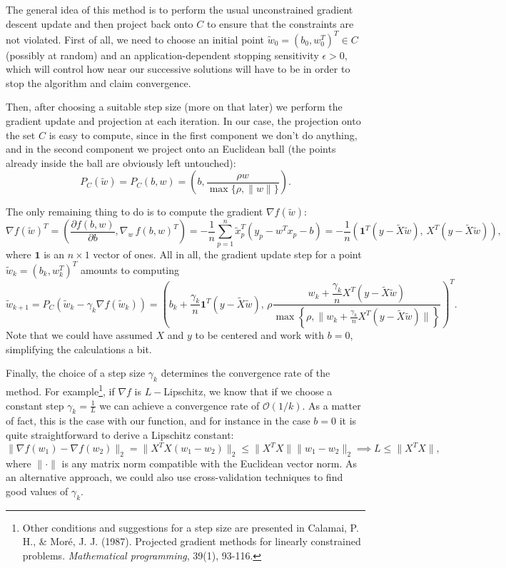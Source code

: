 \documentclass[11pt]{article}
\begin{document}
The general idea of this method is to perform the usual unconstrained gradient descent update and then project back onto $C$ to ensure that the constraints are not violated. First of all, we need to choose an initial point $\tilde w_0=(b_0, w_0^T)^T\in C$ (possibly at random) and an application-dependent stopping sensitivity $\epsilon > 0$, which will control how near our successive solutions will have to be in order to stop the algorithm and claim convergence.

Then, after choosing a suitable step size (more on that later) we perform the gradient update and projection at each iteration. In our case, the projection onto the set $C$ is easy to compute, since in the first component we don't do anything, and in the second component we project onto an Euclidean ball (the points already inside the ball are obviously left untouched):
\[
P_C(\tilde w) = P_C(b, w) = \left(b, \frac{\rho w}{\max\{\rho, \|w\|\}}\right).
\]

The only remaining thing to do is to compute the gradient $\nabla f(\tilde w)$:
\[
\nabla f(\tilde w)^T = \left(\frac{\partial f(b, w)}{\partial b}, \nabla_w \, f(b, w)^T \right) = -\frac{1}{n} \sum_{p=1}^n \tilde x_p^T(y_p - w^Tx_p - b)= -\frac{1}{n}\left(\boldsymbol{1}^T(y-\tilde X\tilde w), \, X^T(y-\tilde X\tilde w)\right),
\]
where $\boldsymbol{1}$ is an $n\times 1$ vector of ones. All in all, the gradient update step for a point $\tilde w_k = (b_k, w_k^T)^T$ amounts to computing
\[
\tilde w_{k+1} = P_C(\tilde w_k-\gamma_k\nabla f(\tilde w_k)) = \left(b_k + \frac{\gamma_k}{n} \boldsymbol{1}^T(y-\tilde X\tilde w), \, \rho \frac{w_k + \dfrac{\gamma_k}{n} X^T(y-\tilde X\tilde w)}{\max \left\{ \rho, \|w_k + \frac{\gamma_k}{n} X^T(y-\tilde X \tilde w)\|\right\}} \right)^T.
\]
Note that we could have assumed $X$ and $y$ to be centered and work with $b=0$, simplifying the calculations a bit.

Finally, the choice of a step size $\gamma_k$ determines the convergence rate of the method. For example\footnote{Other conditions and suggestions for a step size are presented in Calamai, P. H., \& Moré, J. J. (1987). Projected gradient methods for linearly constrained problems. \textit{Mathematical programming}, 39(1), 93-116.}, if $\nabla f$ is $L-$Lipschitz, we know that if we choose a constant step $\gamma_k=\frac{1}{L}$ we can achieve a convergence rate of $\mathcal O(1/k)$. As a matter of fact, this is the case with our function, and for instance in the case $b=0$ it is quite straightforward to derive a Lipschitz constant:
\[
\|\nabla f(w_1) - \nabla f(w_2)\|_2 = \|X^TX(w_1-w_2)\|_2 \leq \|X^TX\|\|w_1-w_2\|_2 \implies L\leq \|X^TX\|,
\]
where $\|\cdot\|$ is any matrix norm compatible with the Euclidean vector norm. As an alternative approach, we could also use cross-validation techniques to find good values of $\gamma_k$.
\end{document}

